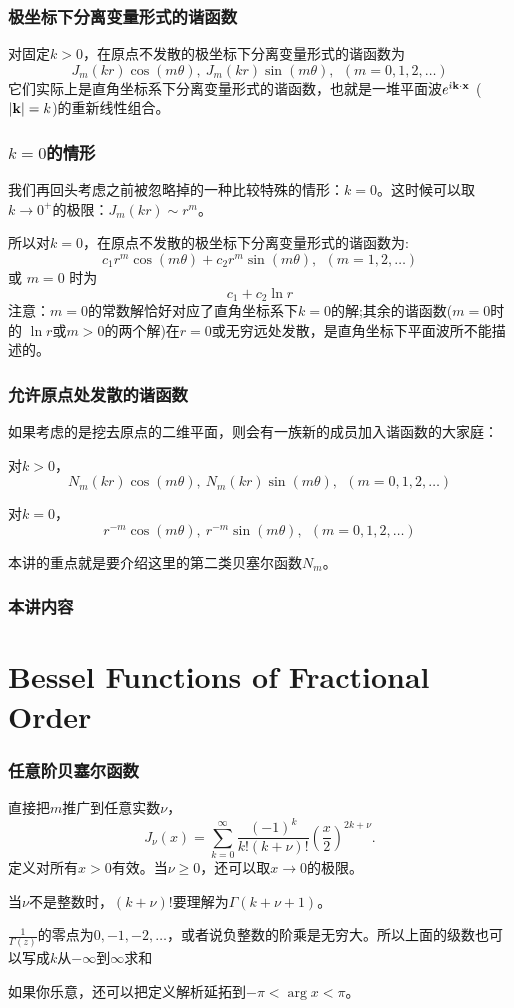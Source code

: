 \documentclass[CJK]{beamer}
\date{}
\begin{document}
  \bch
{}


\begin{frame}
  \frametitle{极坐标下分离变量形式的谐函数}
对固定$k>0$，在原点不发散的极坐标下分离变量形式的谐函数为
$$ J_m(kr)\cos(m\theta), \ J_m(kr)\sin(m\theta), \ \ (m=0,1,2,\ldots) $$
它们实际上是直角坐标系下分离变量形式的谐函数，也就是一堆平面波$e^{{\dot{\imath}} {\mathbf{k}} \cdot {\mathbf{x}}}$ ($|{\mathbf{k}}|=k$)的重新线性组合。
\end{frame}


\begin{frame}
  \frametitle{$k=0$的情形}
  我们再回头考虑之前被忽略掉的一种比较特殊的情形：$k=0$。这时候可以取$k\rightarrow 0^+$的极限：$ J_m(kr)\sim  r^m$。

  所以对$k=0$，在原点不发散的极坐标下分离变量形式的谐函数为:
  $$ c_1 r^m \cos(m\theta)+c_2 r^m \sin(m\theta), \ \ (m=1,2,\ldots)$$
  或 $m=0$ 时为
  $$ c_1+c_2\ln r$$
  {\scriptsize 注意：$m=0$的常数解恰好对应了直角坐标系下$k=0$的解;其余的谐函数($m=0$时的 $\ln r$或$m>0$的两个解)在$r=0$或无穷远处发散，是直角坐标下平面波所不能描述的。}
\end{frame}


\begin{frame}
  \frametitle{允许原点处发散的谐函数}
  如果考虑的是挖去原点的二维平面，则会有一族新的成员加入谐函数的大家庭：
  \bitem
\item{对$k>0$，
  $$N_m(kr)\cos(m\theta), \ N_m(kr)\sin(m\theta), \ \ (m=0,1,2,\ldots) $$}
\item{对$k=0$，
  $$r^{-m} \cos(m\theta), \ r^{-m} \sin(m\theta), \ \ (m=0,1,2,\ldots)$$}
  \eitem

  本讲的重点就是要介绍这里的第二类贝塞尔函数$N_m$。
\end{frame}


\begin{frame}
\frametitle{本讲内容}

\tableofcontents
\end{frame}

\section{Bessel Functions of Fractional Order}

\begin{frame}
\frametitle{任意阶贝塞尔函数}

直接把$m$推广到任意实数$\nu$，
\tbox
    {$$J_\nu(x) = \sum_{k=0}^\infty \frac{(-1)^k}{k!(k+\nu)!} \left(\frac{x}{2}\right)^{2k+\nu}.$$}
    定义对所有$x>0$有效。当$\nu \ge 0$，还可以取$x \rightarrow 0$的极限。


    
    \skiplines
    \bitem
  \item{当$\nu$不是整数时，$(k+\nu)!$要理解为$\Gamma(k+\nu+1)$。}
  \item{$\frac{1}{\Gamma(z)}$的零点为$0,-1,-2,\ldots$，或者说负整数的阶乘是无穷大。所以上面的级数也可以写成$k$从$-\infty$到$\infty$求和}
  \item{如果你乐意，还可以把定义解析延拓到$-\pi<\arg x<\pi$。}
    \eitem

\end{frame}
\end{document}

